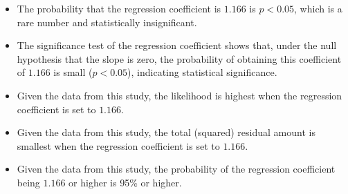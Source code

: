 \begin{itemize}
	\item The probability that the regression coefficient is $1.166$ is $p<0.05$, which is a rare number and statistically insignificant.
	\item The significance test of the regression coefficient shows that, under the null hypothesis that the slope is zero, the probability of obtaining this coefficient of $1.166$ is small ($p<0.05$), indicating statistical significance.
	\item Given the data from this study, the likelihood is highest when the regression coefficient is set to $1.166$.
	\item Given the data from this study, the total (squared) residual amount is smallest when the regression coefficient is set to $1.166$.
	\item Given the data from this study, the probability of the regression coefficient being $1.166$ or higher is 95\% or higher.
\end{itemize}

